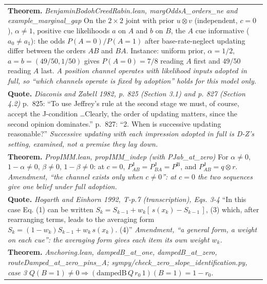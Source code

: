 \documentclass[10pt]{article}
\theoremstyle{definition}
\newcommand{\PB}{P^{\mathrm{B}}}
\newcommand{\PJ}{P^{\mathrm{J}}}
\newlength{\fullw}\setlength{\fullw}{25.9cm}
\begin{document}
{\begin{longtable}{|p{0.9cm}|p{12.2cm}|p{12.2cm}|}
\multicolumn{3}{|p{\fullw}|}{\textbf{Theorem.} \textit{BenjaminBodohCreedRabin.lean, margOddsA\_orders\_ne and example\_marginal\_gap} \newline On the $2\times2$ joint with prior $u\otimes v$ (independent, $c=0$),
$\alpha\neq1$, positive cue likelihoods $a$ on $A$ and $b$ on $B$, the $A$
cue informative ($a_0\neq a_1$): the odds $P(A{=}0)/P(A{=}1)$ after base-rate-neglect updating
differ between the orders $AB$ and $BA$. Instance: uniform prior,
$\alpha=1/2$, $a=b=(49/50,1/50)$ gives $P(A{=}0)=7/8$ reading $A$ first and
$49/50$ reading $A$ last. \newline \textit{A position channel operates with likelihood inputs adopted in full,
so ``which channels operate is fixed by adoption'' holds for this model only.}} \\
\multicolumn{3}{|p{\fullw}|}{\textbf{Quote.} \textit{Diaconis and Zabell 1982, p. 825 (Section 3.1) and p. 827 (Section 4.2)} \newline p.~825: ``To use Jeffrey's rule at the second stage we must, of
course, accept the J-condition \ldots Clearly, the order of updating matters,
since the second opinion dominates.'' p.~827: ``2. When is successive updating
reasonable?'' \newline \textit{Successive updating with each impression adopted in full is D-Z's
setting, examined, not a premise they lay down.}} \\
\multicolumn{3}{|p{\fullw}|}{\textbf{Theorem.} \textit{PropIMM.lean, propIMM\_indep (with PJab\_at\_zero)} \newline For $\alpha\neq0$, $1-\alpha\neq0$, $\beta\neq0$, $1-\beta\neq0$: at $c=0$,
$\PJ_{AB}=\PJ_{BA}=\PB$, and $\PJ_{AB}=q\otimes r$. \newline \textit{Amendment, ``the channel exists only when $c\neq0$'': at $c=0$ the two sequences give one belief under full adoption.}} \\
\multicolumn{3}{|p{\fullw}|}{\textbf{Quote.} \textit{Hogarth and Einhorn 1992, T-p.7 (transcription), Eqs. 3-4} \newline ``In this case Eq. (1) can be written
$S_k = S_{k-1} + w_k[\,s(x_k) - S_{k-1}\,]$, (3) which, after rearranging terms,
leads to the averaging form $S_k = (1 - w_k)S_{k-1} + w_k\,s(x_k)$. (4)'' \newline \textit{Amendment, ``a general form, a weight on each cue'': the averaging form gives each item its own weight $w_k$.}} \\
\multicolumn{3}{|p{\fullw}|}{\textbf{Theorem.} \textit{Anchoring.lean, dampedB\_at\_one, dampedB\_at\_zero, routeDamped\_at\_zero\_pins\_A; sympy/check\_zero\_slope\_identification.py, case 3} \newline $Q(B{=}1)\neq0\Rightarrow(\mathrm{dampedB}\,Q\,r_0\,1)(B{=}1)=1-r_0$.
}
\end{longtable}}
\end{document}
